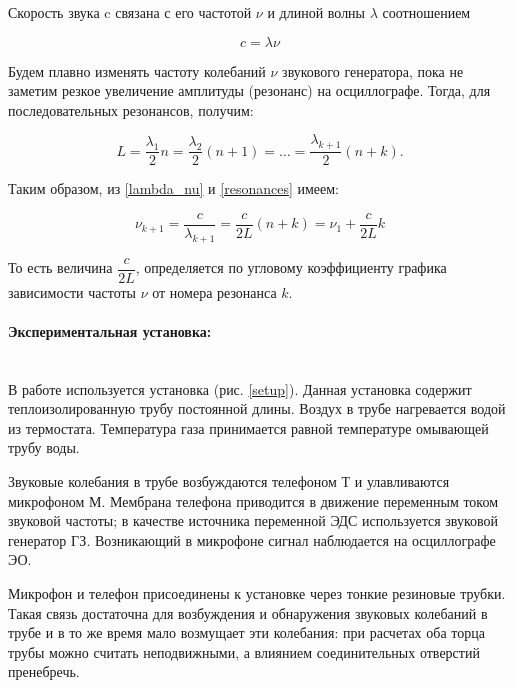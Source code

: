 \documentclass[a4paper, 12pt]{article}
\newcommand{\parag}[1]{\paragraph*{#1:}}
\begin{document}
Скорость звука c связана с его частотой $\nu$ и длиной волны $ \lambda $ соотношением
    
\begin{equation}
    \label{lambda_nu}
    c=\lambda \nu
\end{equation}
    
Будем плавно изменять частоту колебаний $\nu$ звукового генератора, пока не заметим резкое увеличение амплитуды (резонанс) на осциллографе. Тогда, для последовательных резонансов, получим:

\begin{equation}
    \label{resonances}
    L=\frac{\lambda_1}{2}n = \frac{\lambda_2}{2}\left(n+1\right) = \dots = \frac{\lambda_{k+1}}{2}\left(n+k\right).
\end{equation}

Таким образом, из \eqref{lambda_nu} и \eqref{resonances} имеем:

\begin{equation}
    \label{nu}
    \nu_{k+1} = \frac{c}{\lambda_{k+1}} = \frac{c}{2L}\left(n+k\right)= \nu_1 + \frac{c}{2L} k
\end{equation}

То есть величина $\dfrac{c}{2L}$, определяется по угловому коэффициенту графика зависимости частоты $\nu$ от номера резонанса $k$.

\parag {Экспериментальная установка} ~\\

    
В работе используется установка (рис. \ref{setup}). Данная установка содержит теплоизолированную трубу постоянной длины. Воздух в трубе нагревается водой из термостата. Температура газа принимается равной температуре омывающей трубу воды. 

Звуковые колебания в трубе возбуждаются телефоном Т и улавливаются микрофоном М. Мембрана телефона приводится в движение переменным током звуковой частоты; в качестве источника переменной ЭДС используется звуковой генератор ГЗ. Возникающий в микрофоне сигнал наблюдается на осциллографе ЭО.

Микрофон и телефон присоединены к установке через тонкие резиновые трубки. Такая связь достаточна для возбуждения и обнаружения звуковых колебаний в трубе и в то же время мало возмущает эти колебания: при расчетах оба торца трубы можно считать неподвижными, а влиянием соединительных отверстий пренебречь.
\end{document}

